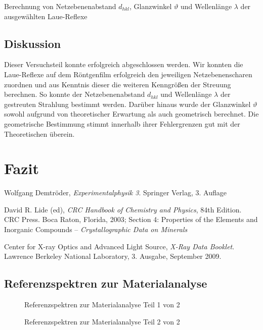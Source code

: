 \documentclass[11pt, a4paper]{article}
\begin{document}
\begin{table}[h]
\centering

\caption{Berechnung von Netzebenenabstand $d_{hkl}$, Glanzwinkel $\vartheta$ und Wellenlänge $\lambda$ der ausgewählten Laue-Reflexe}
\label{tab:laue_winkel}
\end{table}

\subsection{Diskussion}
Dieser Versuchsteil konnte erfolgreich abgeschlossen werden.
Wir konnten die Laue-Reflexe auf dem Röntgenfilm erfolgreich den jeweiligen Netzebenenscharen zuordnen und aus Kenntnis dieser die weiteren Kenngrößen der Streuung berechnen.
So konnte der Netzebenenabstand $d_{hkl}$ und Wellenlänge $\lambda$ der gestreuten Strahlung bestimmt werden.
Darüber hinaus wurde der Glanzwinkel $\vartheta$ sowohl aufgrund von theoretischer Erwartung als auch geometrisch berechnet.
Die geometrische Bestimmung stimmt innerhalb ihrer Fehlergrenzen gut mit der Theoretischen überein.


\section{Fazit}





\begin{thebibliography}{9}
	Wolfgang Demtröder,
	\emph{Experimentalphysik 3}.
	Springer Verlag,
	3. Auflage

  David R. Lide (ed),
  \emph{CRC Handbook of Chemistry and Physics},
  84th Edition. CRC Press. Boca Raton, Florida, 2003;
  Section 4: Properties of the Elements and Inorganic Compounds --
  \emph{Crystallographic Data on Minerals}

  Center for X-ray Optics and Advanced Light Source,
  \emph{X-Ray Data Booklet}.
  Lawrence Berkeley National Laboratory,
  3. Ausgabe,
  September 2009.
\end{thebibliography}

\newpage

\begin{appendix}
\section{Referenzspektren zur Materialanalyse}
\label{sec:referenzspektren}
\begin{figure}[!h]
\centering
\resizebox{\columnwidth}{!}{%
}
\caption{Referenzspektren zur Materialanalyse Teil 1 von 2}
\end{figure}

\begin{figure}[h]
\centering
\resizebox{\columnwidth}{!}{%
}
\caption{Referenzspektren zur Materialanalyse Teil 2 von 2}
\end{figure}
\end{appendix}
\end{document}
